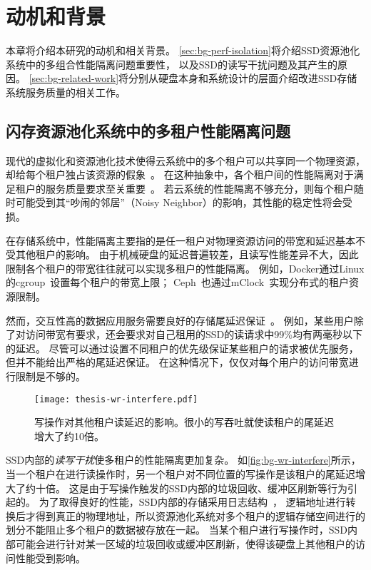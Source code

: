 
\chapter{动机和背景}
\label{chap:background}

本章将介绍本研究的动机和相关背景。
\autoref{sec:bg-perf-isolation}将介绍SSD资源池化系统中的多组合性能隔离问题重要性，
以及SSD的读写干扰问题及其产生的原因。
\autoref{sec:bg-related-work}将分别从硬盘本身和系统设计的层面介绍改进SSD存储系统服务质量的相关工作。

\section{闪存资源池化系统中的多租户性能隔离问题}
\label{sec:bg-perf-isolation}

现代的虚拟化和资源池化技术使得云系统中的多个租户可以共享同一个物理资源，却给每个租户独占该资源的假象~\cite{bugnion2017hardware}。
在这种抽象中，各个租户间的性能隔离对于满足租户的服务质量要求至关重要~\cite{somani2009isolation}。
若云系统的性能隔离不够充分，则每个租户随时可能受到其“吵闹的邻居”（Noisy Neighbor）的影响，其性能的稳定性将会受损。

在存储系统中，性能隔离主要指的是任一租户对物理资源访问的带宽和延迟基本不受其他租户的影响。
由于机械硬盘的延迟普遍较差，且读写性能差异不大，因此限制各个租户的带宽往往就可以实现多租户的性能隔离。
例如，Docker通过Linux的cgroup~\cite{cgroup}设置每个租户的带宽上限；
Ceph~\cite{weil2006ceph}也通过mClock~\cite{gulati2010mclock}实现分布式的租户资源限制。

然而，交互性高的数据应用服务需要良好的存储尾延迟保证~\cite{dean2013tail,hao2016tail}。
例如，某些用户除了对访问带宽有要求，还会要求对自己租用的SSD的读请求中99\%均有两毫秒以下的延迟。
尽管可以通过设置不同租户的优先级保证某些租户的请求被优先服务，但并不能给出严格的尾延迟保证。
在这种情况下，仅仅对每个用户的访问带宽进行限制是不够的。

\begin{figure}[h]
  \centering
  \texttt{[image: thesis-wr-interfere.pdf]}
  \caption{写操作对其他租户读延迟的影响。很小的写吞吐就使读租户的尾延迟增大了约10倍。}
  \label{fig:bg-wr-interfere}
\end{figure}

SSD内部的\textit{读写干扰}使多租户的性能隔离更加复杂。
如\autoref{fig:bg-wr-interfere}所示，当一个租户在进行读操作时，另一个租户对不同位置的写操作是该租户的尾延迟增大了约十倍。
这是由于写操作触发的SSD内部的垃圾回收、缓冲区刷新等行为引起的。
为了取得良好的性能，SSD内部的存储采用日志结构~\cite{ArpaciDusseau18-Book}，
逻辑地址进行转换后才得到真正的物理地址，所以资源池化系统对多个租户的逻辑存储空间进行的划分不能阻止多个租户的数据被存放在一起。
当某个租户进行写操作时，SSD内部可能会进行针对某一区域的垃圾回收或缓冲区刷新，使得该硬盘上其他租户的访问性能受到影响。

